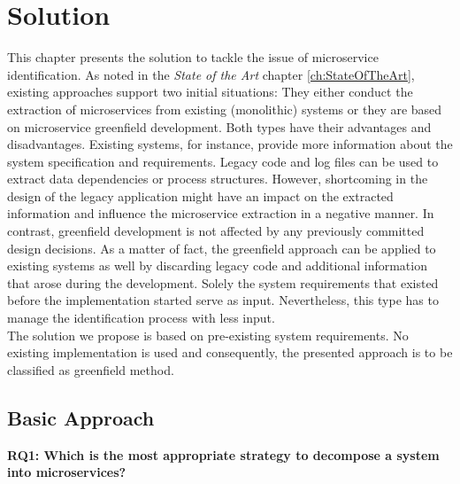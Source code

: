 \chapter{Solution}
\label{ch:Solution}
This chapter presents the solution to tackle the issue of microservice identification. 
As noted in the \textit{State of the Art} chapter \ref{ch:StateOfTheArt}, existing approaches support two initial situations: They either conduct the extraction of microservices from existing (monolithic) systems or they are based on microservice greenfield development. Both types have their advantages and disadvantages. Existing systems, for instance, provide more information about the system specification and requirements. Legacy code and log files can be used to extract data dependencies or process structures. However, shortcoming in the design of the legacy application might have an impact on the extracted information and influence the microservice extraction in a negative manner. In contrast, greenfield development is not affected by any previously committed design decisions. As a matter of fact, the greenfield approach can be applied to existing systems as well by discarding legacy code and additional information that arose during the development. Solely the system requirements that existed before the implementation started serve as input. Nevertheless, this type has to manage the identification process with less input.\\
The solution we propose is based on pre-existing system requirements. No existing implementation is used and consequently, the presented approach is to be classified as greenfield method.\\



\section{Basic Approach}


\vspace{0.5cm}
\par
\begingroup
\leftskip=1cm
\rightskip=1cm

\noindent
\textbf{RQ1: Which is the most appropriate strategy to decompose a system into microservices? }

\endgroup
\vspace{0.5cm}



